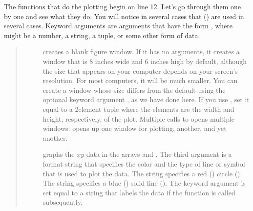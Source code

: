 \documentclass[letterpaper,10pt,english]{sphinxmanual}
\begin{document}
\sphinxAtStartPar
The functions that do the plotting begin on line 12.  Let’s go through them one by one and see what they do.  You will notice in several cases that  () are used in several cases.  Keyword arguments are  arguments that have the form  , where  might be a number, a string, a tuple, or some other form of data.
\begin{quote}
\begin{description}
\item[{}] \leavevmode
\sphinxAtStartPar
creates a blank figure window.  If it has no arguments, it creates a window that is 8 inches wide and 6 inches high by default, although the size that appears on your computer depends on your screen’s resolution.  For most computers, it will be much smaller.  You can create a window whose size differs from the default using the optional keyword argument , as we have done here.  If you use , set it equal to a 2\sphinxhyphen{}element tuple where the elements are the width and height, respectively, of the plot.  Multiple calls to  opens multiple windows:   opens up one window for plotting,  another, and  yet another.

\item[{  \sphinxcode{\sphinxupquote{)}}}] \leavevmode
\sphinxAtStartPar
graphs the \(x\)\sphinxhyphen{}\(y\) data in the arrays  and .  The third argument is a format string that specifies the color and the type of line or symbol that is used to plot the data.  The string  specifies a red () circle ().  The string  specifies a blue () solid line (\sphinxcode{\sphinxupquote{\sphinxhyphen{}}}).  The keyword argument  is set equal to a string that labels the data if the  function is called subsequently.


\end{description}
\end{quote}
\end{document}
